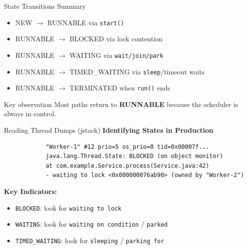 \documentclass[aspectratio=169,11pt]{beamer}
\begin{document}
	\begin{frame}{State Transitions Summary}
		\begin{itemize}
			\item NEW $\rightarrow$ RUNNABLE via \texttt{start()}
			\item RUNNABLE $\rightarrow$ BLOCKED via lock contention
			\item RUNNABLE $\rightarrow$ WAITING via \texttt{wait/join/park}
			\item RUNNABLE $\rightarrow$ TIMED\_WAITING via \texttt{sleep}/timeout waits
			\item RUNNABLE $\rightarrow$ TERMINATED when \texttt{run()} ends
		\end{itemize}
		
		\vspace{3mm}
		\begin{block}{Key observation}
			Most paths return to \textbf{RUNNABLE} because the scheduler is always in control.
		\end{block}
	\end{frame}
	
	\begin{frame}[fragile]{Reading Thread Dumps (jstack)}
		\textbf{Identifying States in Production}
		\vspace{2mm}
		
		\begin{verbatim}
			"Worker-1" #12 prio=5 os_prio=0 tid=0x00007f...
			java.lang.Thread.State: BLOCKED (on object monitor)
			at com.example.Service.process(Service.java:42)
			- waiting to lock <0x000000076ab90> (owned by "Worker-2")
		\end{verbatim}
		
		\vspace{2mm}
		\textbf{Key Indicators:}
		\begin{itemize}
			\item \texttt{BLOCKED}: look for \texttt{waiting to lock}
			\item \texttt{WAITING}: look for \texttt{waiting on condition} / \texttt{parked}
			\item \texttt{TIMED\_WAITING}: look for \texttt{sleeping} / \texttt{parking for}
		\end{itemize}
	\end{frame}
	
\end{document}
